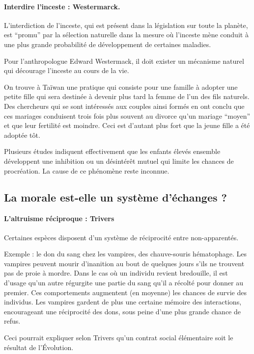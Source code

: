 	\paragraph{Interdire l'inceste : Westermarck.}
	L'interdiction de l'inceste, qui est présent dans la législation sur toute la planète, est “promu” par la sélection naturelle dans la mesure où l'inceste mène conduit à une plus grande probabilité de développement de certaines maladies.
	
	Pour l'anthropologue Edward Westermack, il doit exister un mécanisme naturel qui décourage l'inceste au cours de la vie.

	On trouve à Taïwan une pratique qui consiste pour une famille à adopter une petite fille qui sera destinée à devenir plus tard la femme de l'un des fils naturels.
	Des chercheurs qui se sont intéressés aux couples ainsi formés en ont conclu que ces mariages conduisent trois fois plus souvent au divorce qu'un mariage “moyen” et que leur fertilité est moindre.
	Ceci est d'autant plus fort que la jeune fille a été adoptée tôt.

	Plusieurs études indiquent effectivement que les enfants élevés ensemble développent une inhibition ou un désintérêt mutuel qui limite les chances de procréation.
	La cause de ce phénomène reste inconnue.

\subsection{La morale est-elle un système d'échanges ?}
	\paragraph{L'altruisme réciproque : Trivers}
	Certaines espèces disposent d'un système de réciprocité entre non-apparentés.

	Exemple : le don du sang chez les vampires, des chauve-souris hématophage.
	Les vampires peuvent mourir d'inanition au bout de quelques jours s'ils ne trouvent pas de proie à mordre.
	Dans le cas où un individu revient bredouille, il est d'usage qu'un autre régurgite une partie du sang qu'il a récolté pour donner au premier.
	Ces comportements augmentent (en moyenne) les chances de survie des individus.
	Les vampires gardent de plus une certaine mémoire des interactions, encourageant une réciprocité des dons, sous peine d'une plus grande chance de refus.
	
	Ceci pourrait expliquer selon Trivers qu’un contrat social élémentaire soit le résultat de l’Évolution.

